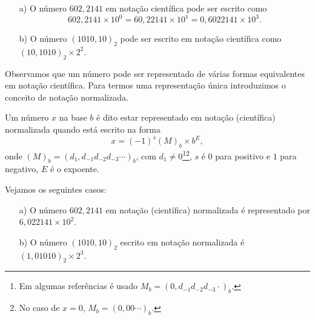 \begin{ex}
  \begin{itemize}
  \item[a)] O número $602,2141$ em notação científica pode ser escrito como
    \begin{equation*}
      602,2141\times 10^0 = 60,22141\times 10^{1} = 0,6022141\times 10^{3}.
    \end{equation*}
  \item[b)] O número $(1010,10)_2$ pode ser escrito em notação científica como $(10,1010)_2\times 2^2$.
  \end{itemize}
\end{ex}

Observamos que um número pode ser representado de várias formas equivalentes em notação científica. Para termos uma representação única introduzimos o conceito de notação normalizada.

\begin{defn}
  Um número $x$ na base $b$ é dito estar representado em notação (científica) normalizada quando está escrito na forma
  \begin{equation*}
    x=(-1)^{s}(M)_b \times b^{E},
  \end{equation*}
onde $(M)_b = (d_1,d_{-1}d_{-2}d_{-3}\cdots)_b$, com $d_{1}\neq 0$\footnote{Em algumas referências é usado $M_b = (0,d_{-1}d_{-2}d_{-3}\cdot)_b$.}\footnote{No caso de $x=0$, $M_b = (0,00\cdots)_b$.}, $s$ é $0$ para positivo e $1$ para negativo, $E$ é o expoente.
 \end{defn}

\begin{ex} Vejamos os seguintes casos:
  \begin{itemize}
  \item[a)] O número $602,2141$ em notação (científica) normalizada é representado por $6,022141\times 10^{2}$.
  \item[b)] O número $(1010,10)_2$ escrito em notação normalizada é $(1,01010)_2\times 2^3$.
  \end{itemize}
\end{ex}

